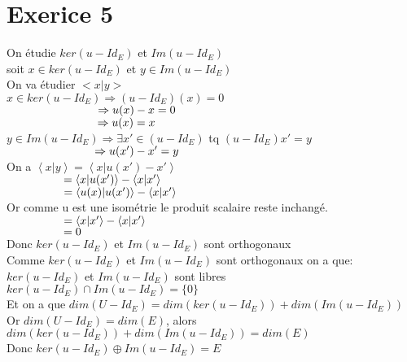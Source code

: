 \documentclass{article}
\author{Frederic Becerril}
\newcommand\tab[1][1cm]{\hspace*{#1}}
\newcommand{\scalaire}[2]{\left< #1 | #2\right>}
\begin{document}
\part*{Exerice 5}

On étudie $ker(u - Id_E)$ et $Im(u - Id_E)$\\
soit $x \in ker(u - Id_E)$ et $y \in Im(u - Id_E)$\\
On va étudier $<x|y>$\\
$x \in ker(u - Id_E) \Rightarrow (u - Id_E)(x) = 0$\\
$\tab[2.8cm] \Rightarrow u(x) - x = 0$\\
$\tab[2.8cm] \Rightarrow u(x) = x$\\
$y \in Im(u - Id_E) \Rightarrow \exists x' \in (u - Id_E)$ tq $(u - Id_E)x' = y$\\
$\tab[2.7cm] \Rightarrow u(x') - x' = y$\\
On a $\scalaire{x}{y} = \scalaire{x}{u(x') - x'}$\\
$\tab[1.75cm] = \scalaire{x}{u(x')} - \scalaire{x}{x'}$\\
$\tab[1.75cm] = \scalaire{u(x)}{u(x')} - \scalaire{x}{x'}$\\
Or comme u est une isométrie le produit scalaire reste inchangé.\\
$\tab[1.75cm] = \scalaire{x}{x'} - \scalaire{x}{x'}$\\
$\tab[1.75cm] = 0$\\
Donc $ker(u - Id_E)$ et $Im(u - Id_E)$ sont orthogonaux\\
Comme $ker(u - Id_E)$ et $Im(u - Id_E)$ sont orthogonaux on a que:\\
$ker(u - Id_E)$ et $Im(u - Id_E)$ sont libres\\
$ker(u - Id_E) \cap Im(u - Id_E) = \{0\}$\\
Et on a que $dim(U - Id_E) = dim(ker(u - Id_E)) + dim(Im(u - Id_E))$\\
Or $dim(U - Id_E) = dim(E)$, alors $dim(ker(u - Id_E)) + dim(Im(u - Id_E)) = dim(E)$\\
Donc $ker(u - Id_E) \oplus Im(u - Id_E) = E$\\
\end{document}
